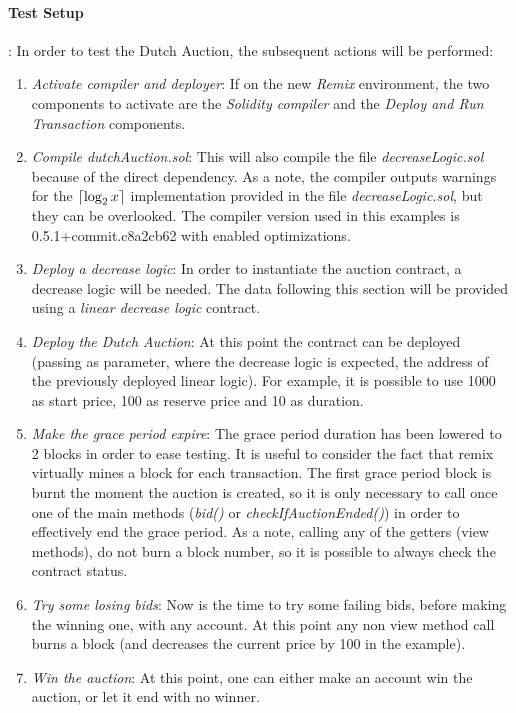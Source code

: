 \documentclass[11pt, a4paper]{report}
\DeclarePairedDelimiter{\ceil}{\lceil}{\rceil}
\begin{document}
		\paragraph*{Test Setup}: In order to test the Dutch Auction, the subsequent actions will be performed:
		\begin{enumerate}
			\item \emph{Activate compiler and deployer}: If on the new \emph{Remix} environment, the two components to activate are the \emph{Solidity compiler} and the \emph{Deploy and Run Transaction} components.
			\item \emph{Compile dutchAuction.sol}: This will also compile the file \emph{decreaseLogic.sol} because of the direct dependency. As a note, the compiler outputs warnings for the $\ceil{\log_2x}$ implementation provided in the file \emph{decreaseLogic.sol}, but they can be overlooked. The compiler version used in this examples is 0.5.1+commit.c8a2cb62 with enabled optimizations.
			\item \emph{Deploy a decrease logic}: In order to instantiate the auction contract, a decrease logic will be needed. The data following this section will be provided using a \emph{linear decrease logic} contract.
			\item \emph{Deploy the Dutch Auction}: At this point the contract can be deployed (passing as parameter, where the decrease logic is expected, the address of the previously deployed linear logic). For example, it is possible to use 1000 as start price, 100 as reserve price and 10 as duration.
			\item \emph{Make the grace period expire}: The grace period duration has been lowered to 2 blocks in order to ease testing. It is useful to consider the fact that remix virtually mines a block for each transaction. The first grace period block is burnt the moment the auction is created, so it is only necessary to call once one of the main methods (\emph{bid()} or \emph{checkIfAuctionEnded()}) in order to effectively end the grace period. As a note, calling any of the getters (view methods), do not burn a block number, so it is possible to always check the contract status.
			\item \emph{Try some losing bids}: Now is the time to try some failing bids, before making the winning one, with any account. At this point any non view method call burns a block (and decreases the current price by 100 in the example).
			\item \emph{Win the auction}: At this point, one can either make an account win the auction, or let it end with no winner.  
		\end{enumerate}
	
\end{document}
